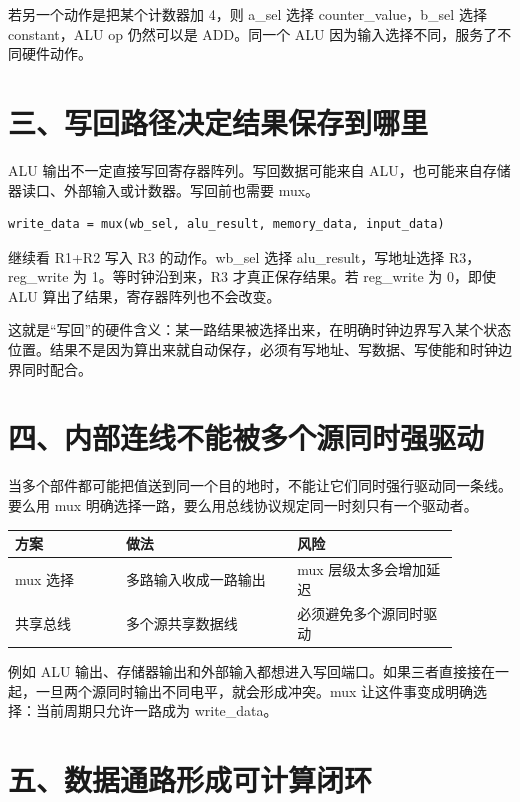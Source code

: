 若另一个动作是把某个计数器加 4，则 a\_sel 选择 counter\_value，b\_sel 选择 constant，ALU op 仍然可以是 ADD。同一个 ALU 因为输入选择不同，服务了不同硬件动作。

\section{三、写回路径决定结果保存到哪里}

ALU 输出不一定直接写回寄存器阵列。写回数据可能来自 ALU，也可能来自存储器读口、外部输入或计数器。写回前也需要 mux。

\begin{lstlisting}
write_data = mux(wb_sel, alu_result, memory_data, input_data)
\end{lstlisting}

继续看 R1+R2 写入 R3 的动作。wb\_sel 选择 alu\_result，写地址选择 R3，reg\_write 为 1。等时钟沿到来，R3 才真正保存结果。若 reg\_write 为 0，即使 ALU 算出了结果，寄存器阵列也不会改变。

这就是“写回”的硬件含义：某一路结果被选择出来，在明确时钟边界写入某个状态位置。结果不是因为算出来就自动保存，必须有写地址、写数据、写使能和时钟边界同时配合。

\section{四、内部连线不能被多个源同时强驱动}

当多个部件都可能把值送到同一个目的地时，不能让它们同时强行驱动同一条线。要么用 mux 明确选择一路，要么用总线协议规定同一时刻只有一个驱动者。

\begin{longtable}{p{0.22\linewidth}p{0.34\linewidth}p{0.32\linewidth}}
\toprule
方案 & 做法 & 风险 \\
\midrule
mux 选择 & 多路输入收成一路输出 & mux 层级太多会增加延迟 \\
共享总线 & 多个源共享数据线 & 必须避免多个源同时驱动 \\
\bottomrule
\end{longtable}

例如 ALU 输出、存储器输出和外部输入都想进入写回端口。如果三者直接接在一起，一旦两个源同时输出不同电平，就会形成冲突。mux 让这件事变成明确选择：当前周期只允许一路成为 write\_data。

\section{五、数据通路形成可计算闭环}

